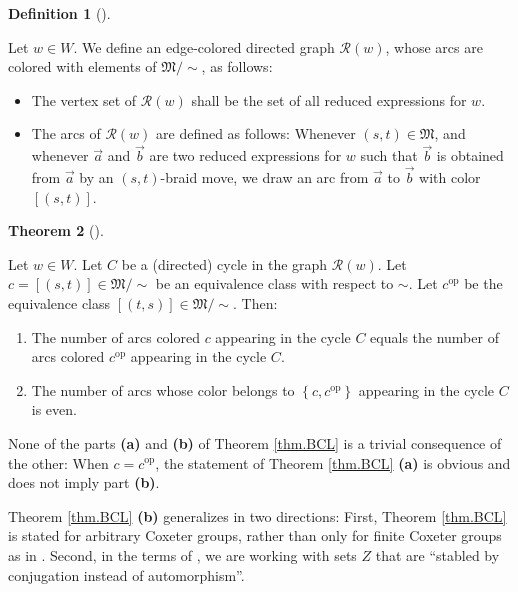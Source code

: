 \documentclass[numbers=enddot,12pt,final,onecolumn,notitlepage,abstracton]{scrartcl}%
\theoremstyle{definition}
\newtheorem{theo}{Theorem}[section]
\newenvironment{theorem}[1][]
{\begin{theo}[#1]\begin{leftbar}}
{\end{leftbar}\end{theo}}
\newtheorem{defi}[theo]{Definition}
\newenvironment{definition}[1][]
{\begin{defi}[#1]\begin{leftbar}}
{\end{leftbar}\end{defi}}
\begin{document}
\begin{definition}
\label{def.R}Let $w\in W$. We define an edge-colored directed graph
$\mathcal{R}\left(  w\right)  $, whose arcs are colored with elements of
$\mathfrak{M}/\sim$, as follows:

\begin{itemize}
\item The vertex set of $\mathcal{R}\left(  w\right)  $ shall be the set of
all reduced expressions for $w$.

\item The arcs of $\mathcal{R}\left(  w\right)  $ are defined as follows:
Whenever $\left(  s,t\right)  \in\mathfrak{M}$, and whenever
$\overrightarrow{a}$ and $\overrightarrow{b}$ are two reduced expressions for
$w$ such that $\overrightarrow{b}$ is obtained from $\overrightarrow{a}$ by an
$\left(  s,t\right)  $-braid move, we draw an arc from $\overrightarrow{a}$ to
$\overrightarrow{b}$ with color $\left[  \left(  s,t\right)  \right]  $.
\end{itemize}
\end{definition}

\begin{theorem}
\label{thm.BCL}Let $w\in W$. Let $C$ be a (directed) cycle in the graph
$\mathcal{R}\left(  w\right)  $. Let $c=\left[  \left(  s,t\right)  \right]
\in\mathfrak{M}/\sim$ be an equivalence class with respect to $\sim$. Let
$c^{\operatorname*{op}}$ be the equivalence class $\left[  \left(  t,s\right)
\right]  \in\mathfrak{M}/\sim$. Then:

\begin{enumerate}
\item[\textbf{(a)}] The number of arcs colored $c$ appearing in the cycle $C$
equals the number of arcs colored $c^{\operatorname*{op}}$ appearing in the
cycle $C$.

\item[\textbf{(b)}] The number of arcs whose color belongs to $\left\{
c,c^{\operatorname*{op}}\right\}  $ appearing in the cycle $C$ is even.
\end{enumerate}
\end{theorem}

None of the parts \textbf{(a)} and \textbf{(b)} of Theorem \ref{thm.BCL} is a
trivial consequence of the other: When $c=c^{\operatorname*{op}}$, the
statement of Theorem \ref{thm.BCL} \textbf{(a)} is obvious and does not imply
part \textbf{(b)}.

Theorem \ref{thm.BCL} \textbf{(b)} generalizes \cite[Theorem 3.1]{BCL} in two
directions: First, Theorem \ref{thm.BCL} is stated for arbitrary Coxeter
groups, rather than only for finite Coxeter groups as in \cite{BCL}. Second,
in the terms of \cite[Remark 3.3]{BCL}, we are working with sets $Z$ that are
\textquotedblleft stabled by conjugation instead of
automorphism\textquotedblright.
\end{document}
